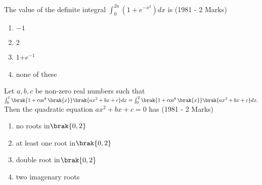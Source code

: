 \iffalse	
\title{Assignment}
\author{Bheri Sai Likith Reddy}
\section{mcq-single}
\fi
	\item The value of the definite integral $\int_0^{2a}(1+e^{-x^2})dx$ is
		\hfill{(1981 - 2 Marks)}
		\begin{enumerate}
                	\item $-1$            
	                \item  $2$
	                \item  $1$+$e^{-1}$    
	\item  none of these
		\end{enumerate}
			\item Let $a,b,c$ be non-zero real numbers such that $\int_0^1 \brak{1+ \cos ^8 \brak{x}} \brak{ax^2 + bx +c} dx = \int_0^2 \brak{ 1+ \cos^8\brak{x} } \brak{ax^2+bx+c} dx.$\\
		Then the quadratic equation $ax^2+bx+c=0$ has
			\hfill{(1981 - 2 Marks)}
			\begin{enumerate}
			\item no roots in$ \brak{0,2}$
			\item at least one root in$ \brak{0,2}$
			\item double root in$ \brak{0,2}  $
	\item two imagenary roots
                        \end{enumerate}
	
